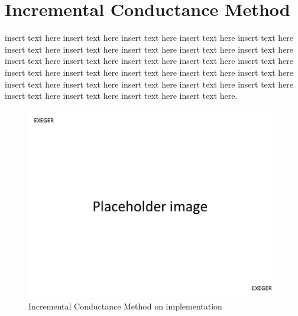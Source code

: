  \section{Incremental Conductance Method }
 insert text here insert text here insert text here insert text here insert text here
 insert text here insert text here insert text here insert text here insert text here insert text here insert text here insert text here insert text here insert text here insert text here insert text here insert text here insert text here insert text here insert text here insert text here insert text here insert text here insert text here insert text here insert text here insert text here insert text here.   \\
  \begin{figure}[H]
   \begin{center}
   \includegraphics[width=\textwidth]{images/pacehold}
   \caption{Incremental Conductance Method on implementation  }
   \label{fig:Inc_result}
   \end{center}
   \end{figure}
